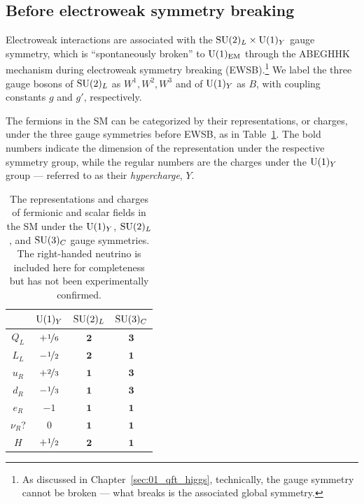 \subsection{Before electroweak symmetry breaking}

Electroweak interactions are associated with the $\SU[2]_L \times \UU[1]_Y$ gauge symmetry, which is ``spontaneously broken'' to $\UU[1]_{\text{EM}}$ through the ABEGHHK mechanism during electroweak symmetry breaking (EWSB).\footnote{As discussed in Chapter~\ref{sec:01_qft_higgs}, technically, the gauge symmetry cannot be broken --- what breaks is the associated global symmetry.}
We label the three gauge bosons of $\SU[2]_L$ as $W^1, W^2, W^3$ and of $\UU[1]_Y$ as $B$, with coupling constants $g$ and $g'$, respectively.

The fermions in the SM can be categorized by their representations, or charges, under the three gauge symmetries before EWSB, as in Table~\ref{tab:01_sm_ew_fermions}.
The bold numbers indicate the dimension of the representation under the respective symmetry group, while the regular numbers are the charges under the $\UU[1]_Y$ group --- referred to as their \textit{hypercharge}, $Y$.

\begin{table}[ht]
	\renewcommand{\arraystretch}{1.5}
	\centering
	\caption{The representations and charges of fermionic and scalar fields in the SM under the $\UU[1]_Y$, $\SU[2]_L$, and $\SU[3]_C$ gauge symmetries. 
	The right-handed neutrino is included here for completeness but has not been experimentally confirmed.}
	\begin{tabular}{c|ccc}
		\toprule
		 & $\UU[1]_Y$ & $\SU[2]_L$ & $\SU[3]_C$ \\
		\midrule
		$Q_L$ & $+ \nicefrac{1}{6}$ & $\mathbf{2}$ & $\mathbf{3}$ \\
		$L_L$ & $- \nicefrac{1}{2}$ & $\mathbf{2}$ & $\mathbf{1}$ \\
		$u_R$ & $+ \nicefrac{2}{3}$ & $\mathbf{1}$ & $\mathbf{3}$ \\
		$d_R$ & $- \nicefrac{1}{3}$ & $\mathbf{1}$ & $\mathbf{3}$ \\
		$e_R$ & $-1$ & $\mathbf{1}$ & $\mathbf{1}$ \\
		$\nu_R$? & $0$ & $\mathbf{1}$ & $\mathbf{1}$ \\
		$H$ & $+ \nicefrac{1}{2}$ & $\mathbf{2}$ & $\mathbf{1}$ \\
		\bottomrule
	\end{tabular}
	\label{tab:01_sm_ew_fermions}
\end{table}

